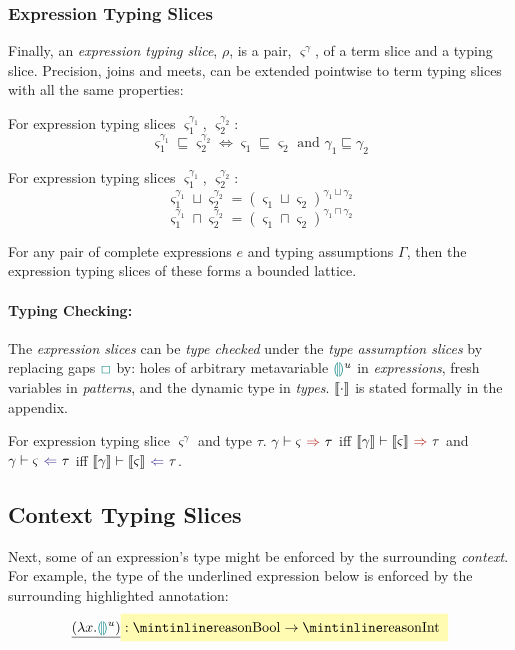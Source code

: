 \subsubsection{Expression Typing Slices}
Finally, an \textit{expression typing slice}, $\rho$, is a pair, $\varsigma^\gamma$, of a term slice and a typing slice. Precision, joins and meets, can be extended pointwise to term typing slices with all the same properties:
\begin{definition}
For expression typing slices $\varsigma_1^{\gamma_1}$, $\varsigma_2^{\gamma_2}$:
\[\varsigma_1^{\gamma_1} \sqsubseteq \varsigma_2^{\gamma_2} \iff  \varsigma_1 \sqsubseteq \varsigma_2 \text{ and } \gamma_1 \sqsubseteq \gamma_2\]
\end{definition}
\begin{definition}
For expression typing slices $\varsigma_1^{\gamma_1}$, $\varsigma_2^{\gamma_2}$:
\[\varsigma_1^{\gamma_1} \sqcup \varsigma_2^{\gamma_2} = (\varsigma_1 \sqcup \varsigma_2)^{\gamma_1 \sqcup \gamma_2}\]
\[\varsigma_1^{\gamma_1} \sqcap \varsigma_2^{\gamma_2} = (\varsigma_1 \sqcap \varsigma_2)^{\gamma_1 \sqcap \gamma_2}\]
\end{definition}

For any pair of complete expressions $e$ and typing assumptions $\Gamma$, then the expression typing slices of these forms a bounded lattice.

\paragraph{Typing Checking:} The \textit{expression slices} can be \textit{type checked} under the \textit{type assumption slices} by replacing gaps ${\color{teal}\Box}$ by: holes of arbitrary metavariable ${\color{teal}\llparenthesis}  {\color{teal}\rrparenthesis}^u$ in \textit{expressions}, fresh variables in \textit{patterns}, and the dynamic type in \textit{types}. $\llbracket \cdot \rrbracket$ is stated formally in the appendix.

\begin{definition}
For expression typing slice $\varsigma^{\gamma}$ and type $\tau$. $\synthesis[\gamma]{\varsigma}{\tau}$ iff $\synthesis[\type{\gamma}]{\type{\varsigma}}{\tau}$ and $\analysis[\gamma]{\varsigma}{\tau}$ iff $\analysis[\type{\gamma}]{\type{\varsigma}}{\tau}$.
\end{definition}
\subsection{Context Typing Slices}\label{sec:ContextTypingSlices}
Next, some of an expression's type might be enforced by the surrounding \textit{context}. For example, the  type of the underlined expression below is enforced by the surrounding highlighted annotation:
\[\underline{(\lambda x. \hole^u )} \hlcmaths[yellow!30]{:  \code{Bool} \hlcmaths[yellow!30]{\to \code{Int}}}\]

